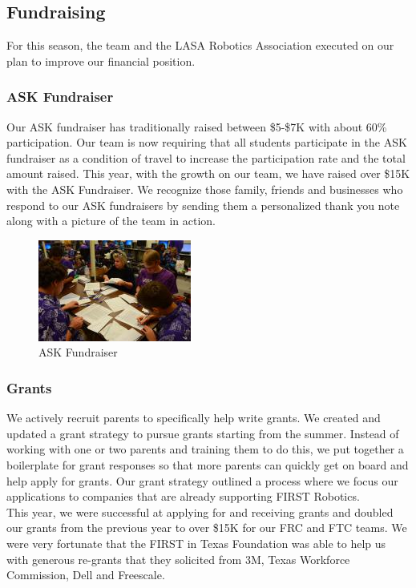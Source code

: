 \subsection{Fundraising}
For this season, the team and the LASA Robotics Association executed on our plan to improve our financial position.

\subsubsection{ASK Fundraiser}
Our ASK fundraiser has traditionally raised between \$5-\$7K with about 60\% participation.  Our team is now requiring that all students participate in the ASK fundraiser as a condition of travel to increase the participation rate and the total amount raised.  This year, with the growth on our team, we have raised over \$15K with the ASK Fundraiser.  We recognize those family, friends and businesses who respond to our ASK fundraisers by sending them a personalized thank you note along with a picture of the team in action. 

\begin{figure}[H]
	\centering
	\includegraphics[height=0.3\linewidth]{ask}
	\caption[]{ASK Fundraiser}
	\label{fig:ask}
\end{figure}

\subsubsection{Grants}
We actively recruit parents to specifically help write grants.  We created and updated a grant strategy to pursue grants starting from the summer.  Instead of working with one or two parents and training them to do this, we put together a boilerplate for grant responses so that more parents can quickly get on board and help apply for grants.  Our grant strategy outlined a process where we focus our applications to companies that are already supporting FIRST Robotics.\\

This year, we were successful at applying for and receiving grants and doubled our grants from the previous year to over \$15K for our FRC and FTC teams.  We were very fortunate that the FIRST in Texas Foundation was able to help us with generous re-grants that they solicited from 3M, Texas Workforce Commission, Dell and Freescale.\\

